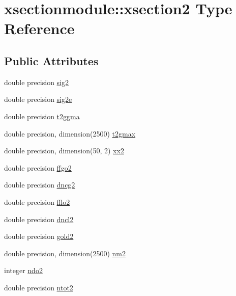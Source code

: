 \hypertarget{structxsectionmodule_1_1xsection2}{}\section{xsectionmodule\+:\+:xsection2 Type Reference}
\label{structxsectionmodule_1_1xsection2}
\subsection*{Public Attributes}
\begin{DoxyCompactItemize}
\item 
double precision \hyperlink{structxsectionmodule_1_1xsection2_a7ec401cf83c0a79f9f77bf322706e96e}{sig2}
\item 
double precision \hyperlink{structxsectionmodule_1_1xsection2_afe9ef64a71ed5be1a5af4327bc2a0d7f}{sig2e}
\item 
double precision \hyperlink{structxsectionmodule_1_1xsection2_af06188e676535bdc861850dc5ae3ffbd}{t2ggma}
\item 
double precision, dimension(2500) \hyperlink{structxsectionmodule_1_1xsection2_a3b28324ee42a57cb7fd485e1fb3fc0d6}{t2gmax}
\item 
double precision, dimension(50, 2) \hyperlink{structxsectionmodule_1_1xsection2_aae4866f265eb9ac4def3122364acc6c5}{xx2}
\item 
double precision \hyperlink{structxsectionmodule_1_1xsection2_ab39eaf40f93097075202df3e81354b7e}{ffgo2}
\item 
double precision \hyperlink{structxsectionmodule_1_1xsection2_aa7229154a3baa6fd81f2a19340364a99}{dncg2}
\item 
double precision \hyperlink{structxsectionmodule_1_1xsection2_ac62b1f53cfd8bd10a7b6cb0f1956ba1e}{fflo2}
\item 
double precision \hyperlink{structxsectionmodule_1_1xsection2_a60064dfc8e4114d504489e56d4531453}{dncl2}
\item 
double precision \hyperlink{structxsectionmodule_1_1xsection2_a0dae7b7584fe4fdbbb4609c96d7cd770}{gold2}
\item 
double precision, dimension(2500) \hyperlink{structxsectionmodule_1_1xsection2_a6abcc35c1ffdd441f0269d0ae470e2e4}{nm2}
\item 
integer \hyperlink{structxsectionmodule_1_1xsection2_a00ab3c31b34a3b1188b366167aec870b}{ndo2}
\item 
double precision \hyperlink{structxsectionmodule_1_1xsection2_ab07bf9fd4a58e522bcf4869c448ceda3}{ntot2}

\end{DoxyCompactItemize}
